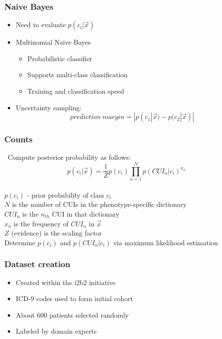 \documentclass{beamer}
\begin{document}
\begin{frame}
\frametitle{Naive Bayes}
\begin{itemize}
\item Need to evaluate $p(c_i|\vec{x})$
\item Multinomial Naive Bayes
\begin{itemize}
\item Probabilistic classifier
\item Supports multi-class classification
\item Training and classification speed
\end{itemize}
\item Uncertainty sampling:
\begin{equation} 
prediction\: margin = |p(c_1|\vec{x}) - p(c_2|\vec{x})|                                                            
\end{equation} 
\end{itemize}
\end{frame}

\begin{frame}
\frametitle{Counts}\
Compute posterior probability as follows:
\begin{equation}                                                                                          
p(c_i|\vec{x}) = \frac{1}{Z}p(c_i)\prod_{n=1}^Np(CUI_n|c_i)^{x_n}
\end{equation}
\fontsize{6.5pt}{7.2}\selectfont
\\
$p(c_i)$ - prior probability of class $c_i$ \\
$N$ is the number of CUIs in the phenotype-specific dictionary \\
$CUI_n$ is the $n_{th}$ CUI in that dictionary \\
$x_n$ is the frequency of $CUI_n$ in $\vec{x}$ \\
$Z$ (evidence) is the scaling factor \\
Determine $p(c_i)$ and $p(CUI_n|c_i)$ via maximum likelihood estimation
\end{frame}

\begin{frame}
\frametitle{Dataset creation}
\begin{itemize}
\item Created within the i2b2 initiative
\item ICD-9 codes used to form initial cohort
\item About 600 patients selected randomly
\item Labeled by domain experts
\end{itemize}
\end{frame}
\end{document}
